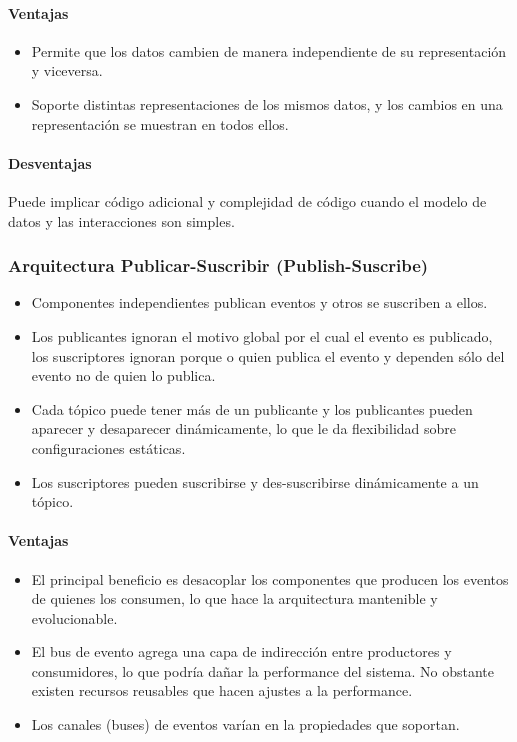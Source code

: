 \paragraph{Ventajas}
\begin{itemize}
	\item Permite que los datos cambien de manera independiente de su representación y viceversa.
	\item Soporte distintas representaciones de los mismos datos, y los cambios en una representación se muestran en todos ellos.
\end{itemize}
\paragraph{Desventajas}
Puede implicar código adicional y complejidad de código cuando el modelo de datos y las interacciones son simples.
\subsubsection{Arquitectura Publicar-Suscribir (Publish-Suscribe)}
\begin{itemize}
	\item Componentes independientes publican eventos y otros se suscriben a ellos.
	\item Los publicantes ignoran el motivo global por el cual el evento es publicado, los suscriptores ignoran porque o quien publica el evento y dependen sólo del evento no de quien lo publica.
	\item Cada tópico puede tener más de un publicante y los publicantes pueden aparecer y desaparecer dinámicamente, lo que le da flexibilidad sobre configuraciones estáticas.
	\item Los suscriptores pueden suscribirse y des-suscribirse dinámicamente a un tópico.
\end{itemize}
\paragraph{Ventajas}
\begin{itemize}
	\item El principal beneficio es desacoplar los componentes que producen los eventos de quienes los consumen, lo que hace la arquitectura mantenible y evolucionable.
	\item El bus de evento agrega una capa de indirección entre productores y consumidores, lo que podría dañar la performance del sistema. No obstante existen recursos reusables que hacen ajustes a la performance.
	\item Los canales (buses) de eventos varían en la propiedades que soportan.
\end{itemize}
